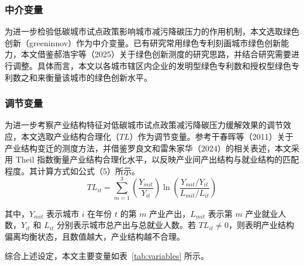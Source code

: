 \documentclass[12pt,a4paper]{ctexart}
\begin{document}
\subsubsection{中介变量}

为进一步检验低碳城市试点政策影响城市减污降碳压力的作用机制，本文选取绿色创新（greeninnov）作为中介变量。已有研究常用绿色专利刻画城市绿色创新能力，本文借鉴郝浩宇等（2025）关于绿色创新测度的研究思路，并结合研究需要进行调整。具体而言，本文以各城市辖区内企业的发明型绿色专利数和授权型绿色专利数之和来衡量该城市的绿色创新水平。

\subsubsection{调节变量}

为进一步考察产业结构特征对低碳城市试点政策减污降碳压力缓解效果的调节效应，本文选取产业结构合理化（$TL$）作为调节变量。参考干春晖等（2011）关于产业结构变迁的测度方法，并借鉴罗良文和雷朱家华（2024）的相关表述，本文采用 Theil 指数衡量产业结构合理化水平，以反映产业间产出结构与就业结构的匹配程度。其计算方式如公式（5）所示。
\begin{equation}
TL_{it}=\sum_{m=1}^{3}\left(\frac{Y_{mit}}{Y_{it}}\right)\ln\left(\frac{Y_{mit}/Y_{it}}{L_{mit}/L_{it}}\right)
\end{equation}

其中，$Y_{mit}$ 表示城市 $i$ 在年份 $t$ 的第 $m$ 产业产出，$L_{mit}$ 表示第 $m$ 产业就业人数，$Y_{it}$ 和 $L_{it}$ 分别表示城市总产出与总就业人数。若 $TL_{it}\neq 0$，则表明产业结构偏离均衡状态，且数值越大，产业结构越不合理。

综合上述设定，本文主要变量如表~\ref{tab:variables} 所示。
\end{document}
